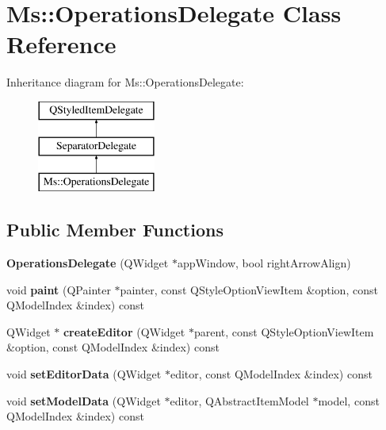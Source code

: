 \hypertarget{class_ms_1_1_operations_delegate}{}\section{Ms\+:\+:Operations\+Delegate Class Reference}
\label{class_ms_1_1_operations_delegate}
Inheritance diagram for Ms\+:\+:Operations\+Delegate\+:\begin{figure}[H]
\begin{center}
\leavevmode
\includegraphics[height=3.000000cm]{class_ms_1_1_operations_delegate}
\end{center}
\end{figure}
\subsection*{Public Member Functions}
\begin{DoxyCompactItemize}
\item 
\mbox{\label{class_ms_1_1_operations_delegate_a71580bbfddabda17167682e144d7da58}} 
{\bfseries Operations\+Delegate} (Q\+Widget $\ast$app\+Window, bool right\+Arrow\+Align)
\item 
\mbox{\label{class_ms_1_1_operations_delegate_a7c06885993ced9582bbe8b7138a13383}} 
void {\bfseries paint} (Q\+Painter $\ast$painter, const Q\+Style\+Option\+View\+Item \&option, const Q\+Model\+Index \&index) const
\item 
\mbox{\label{class_ms_1_1_operations_delegate_a155277f6000917f904fd23fb64a41cb8}} 
Q\+Widget $\ast$ {\bfseries create\+Editor} (Q\+Widget $\ast$parent, const Q\+Style\+Option\+View\+Item \&option, const Q\+Model\+Index \&index) const
\item 
\mbox{\label{class_ms_1_1_operations_delegate_ac31b7747931586a2d569d83a5e8dde7b}} 
void {\bfseries set\+Editor\+Data} (Q\+Widget $\ast$editor, const Q\+Model\+Index \&index) const
\item 
\mbox{\label{class_ms_1_1_operations_delegate_a3b7f6518db2fd1473d142bc2420479e4}} 
void {\bfseries set\+Model\+Data} (Q\+Widget $\ast$editor, Q\+Abstract\+Item\+Model $\ast$model, const Q\+Model\+Index \&index) const
\end{DoxyCompactItemize}


